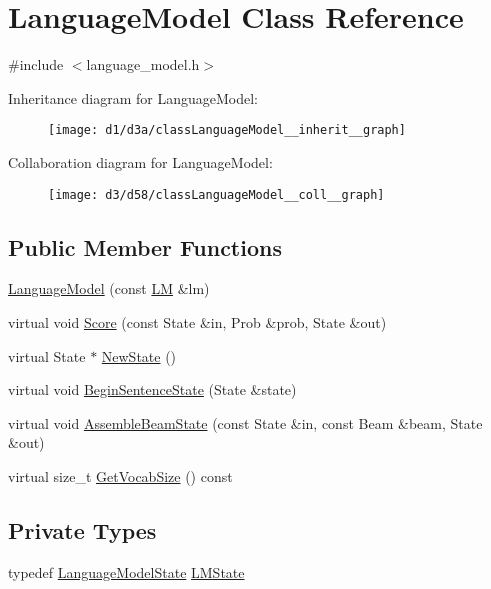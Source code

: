 \hypertarget{classLanguageModel}{}\section{Language\+Model Class Reference}
\label{classLanguageModel}


{\ttfamily \#include $<$language\+\_\+model.\+h$>$}



Inheritance diagram for Language\+Model\+:
\nopagebreak
\begin{figure}[H]
\begin{center}
\leavevmode
\texttt{[image: d1/d3a/classLanguageModel\_\_inherit\_\_graph]}
\end{center}
\end{figure}


Collaboration diagram for Language\+Model\+:
\nopagebreak
\begin{figure}[H]
\begin{center}
\leavevmode
\texttt{[image: d3/d58/classLanguageModel\_\_coll\_\_graph]}
\end{center}
\end{figure}
\subsection*{Public Member Functions}
\begin{DoxyCompactItemize}
\item 
\hyperlink{classLanguageModel_ae49d1d4f89ed5d16c727772fcbb9f886}{Language\+Model} (const \hyperlink{classLM}{LM} \&lm)
\item 
virtual void \hyperlink{classLanguageModel_aaab17275191d2a9080e248282be355be}{Score} (const State \&in, Prob \&prob, State \&out)
\item 
virtual State $\ast$ \hyperlink{classLanguageModel_acf23ce2df7ca1a9f4a0fc951418dbb7f}{New\+State} ()
\item 
virtual void \hyperlink{classLanguageModel_a1344b4e834417a380e2f79137ff6391f}{Begin\+Sentence\+State} (State \&state)
\item 
virtual void \hyperlink{classLanguageModel_a01e4a01d056783dd433c88a968ec04df}{Assemble\+Beam\+State} (const State \&in, const Beam \&beam, State \&out)
\item 
virtual size\+\_\+t \hyperlink{classLanguageModel_afe5aa1473c87082b942a853ce20e9919}{Get\+Vocab\+Size} () const 
\end{DoxyCompactItemize}
\subsection*{Private Types}
\begin{DoxyCompactItemize}
\item 
typedef \hyperlink{classLanguageModelState}{Language\+Model\+State} \hyperlink{classLanguageModel_a528d925f7fa4fcc1da9bc4fb0906f938}{L\+M\+State}
\end{DoxyCompactItemize}
